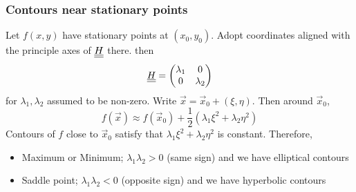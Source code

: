 \documentclass{article}
\begin{document}
\subsubsection{Contours near stationary points}
Let $f(x, y)$ have stationary points at $(x_0, y_0)$. 
Adopt coordinates aligned with the principle axes of $\underline{\underline{H}}$ there.
then
\[
    \underline{\underline{H}} = \begin{pmatrix}
        \lambda_1 & 0 \\
        0 & \lambda_2
    \end{pmatrix}
\]
for $\lambda_1, \lambda_2$ assumed to be non-zero.
Write $\vec x = \vec x_0 + (\xi, \eta)$. Then around $\vec x_0$,
\[
    f(\vec x) \approx f(\vec x_0) + \frac{1}{2}(\lambda_1 \xi^2 + \lambda_2 \eta^2)
\]
Contours of $f$ close to $\vec x_0$ satisfy that $\lambda_1 \xi^2 + \lambda_2 \eta^2$ is constant.
Therefore,
\begin{itemize}
    \item Maximum or Minimum; $\lambda_1\lambda_2 > 0$ (same sign) and we have elliptical contours
    \item Saddle point; $\lambda_1\lambda_2 < 0$ (opposite sign) and we have hyperbolic contours 
\end{itemize}
\end{document}
